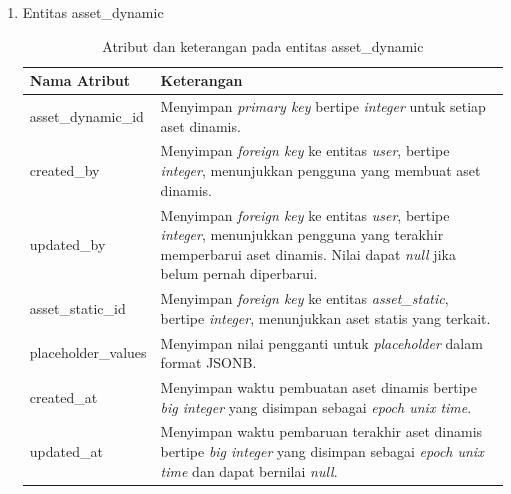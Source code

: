 \begin{enumerate}[label*=\arabic*.,ref=\arabic*]
\begin{enumerate}[label=\arabic*.]
        \item Entitas asset\_dynamic
        \vspace{-0.5em}
        \begin{table}[H]
            \centering
            \begin{tabular}{|p{3.25cm}|p{8cm}|}
                \hline
                \rowcolor[HTML]{DAE8FC} 
                {\color[HTML]{000000} Nama Atribut} & {\color[HTML]{000000} Keterangan}           \\ \hline
                asset\_dynamic\_id                 & Menyimpan \textit{primary key} bertipe \textit{integer} untuk setiap aset dinamis. \\ \hline
                created\_by                        & Menyimpan \textit{foreign key} ke entitas \textit{user}, bertipe \textit{integer}, menunjukkan pengguna yang membuat aset dinamis. \\ \hline
                updated\_by                        & Menyimpan \textit{foreign key} ke entitas \textit{user}, bertipe \textit{integer}, menunjukkan pengguna yang terakhir memperbarui aset dinamis. Nilai dapat \textit{null} jika belum pernah diperbarui. \\ \hline
                asset\_static\_id                  & Menyimpan \textit{foreign key} ke entitas \textit{asset\_static}, bertipe \textit{integer}, menunjukkan aset statis yang terkait. \\ \hline
                placeholder\_values                & Menyimpan nilai pengganti untuk \textit{placeholder} dalam format JSONB. \\ \hline
                created\_at                        & Menyimpan waktu pembuatan aset dinamis bertipe \textit{big integer} yang disimpan sebagai \textit{epoch unix time}. \\ \hline
                updated\_at                        & Menyimpan waktu pembaruan terakhir aset dinamis bertipe \textit{big integer} yang disimpan sebagai \textit{epoch unix time} dan dapat bernilai \textit{null}. \\ \hline
            \end{tabular}
            \caption{Atribut dan keterangan pada entitas asset\_dynamic}
            \label{tab:asset_dynamic_entity}
        \end{table}


\end{enumerate}
\end{enumerate}
